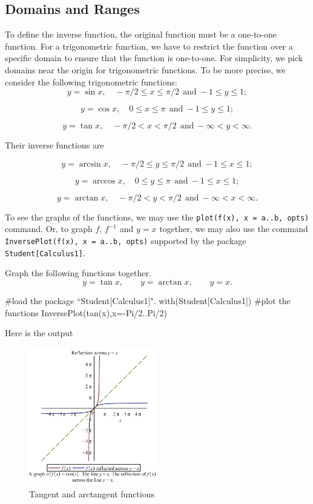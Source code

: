 \documentclass[
  en,11pt,simple]{elegantbook}
\renewenvironment{example}[1][]{
  \refstepcounter{exam}
  \par\noindent\textbf{\color{main}{\examplename} \theexam #1}
  \rmfamily
}{
  \par\ignorespacesafterend
}
\begin{document}
\hypertarget{domains-and-ranges}{%
\subsection{Domains and Ranges}\label{domains-and-ranges}}

To define the inverse function, the original function must be a one-to-one function.
For a trigonometric function, we have to restrict the function over a specific domain to ensure that the function is one-to-one.
For simplicity, we pick domains near the origin for trigonometric functions. To be more precise, we consider the following trigonometric functions:
\[
y=\sin x,\quad -\pi/2\leq x\leq \pi/2 ~~\text{and}~ -1\leq y\leq 1;
\]

\[
y=\cos x,\quad 0\leq x\leq \pi ~~\text{and}~ -1\leq y\leq 1;
\]

\[
y=\tan x,\quad -\pi/2< x< \pi/2 ~~\text{and}~ -\infty<y<\infty.
\]

Their inverse functions are

\[
y=\arcsin x,\quad -\pi/2\leq y\leq \pi/2 ~~\text{and}~ -1\leq x\leq 1;
\]

\[
y=\arccos x,\quad 0\leq y\leq \pi ~~\text{and}~ -1\leq x\leq 1;
\]

\[
y=\arctan x,\quad -\pi/2< y< \pi/2 ~~\text{and}~ -\infty< x<\infty.
\]

To see the graphs of the functions, we may use the \texttt{plot(f(x),\ x\ =\ a..b,\ opts)} command. Or, to graph \(f\), \(f^{-1}\) and \(y=x\) together, we may also use the command \texttt{InversePlot(f(x),\ x\ =\ a..b,\ opts)} supported by the package \texttt{Student{[}Calculus1{]}}.

\begin{example}

Graph the following functions together.
\[
y=\tan x, \qquad y=\arctan x, \qquad y=x.
\]
\end{example}

\begin{solution}
{}
\#load the package ``Student{[}Calculus1{]}".
with(Student{[}Calculus1{]})
\#plot the functions
InversePlot(tan(x),x=-Pi/2..Pi/2)

Here is the output

\begin{figure}
\centering
\includegraphics[width=0.5\textwidth,height=\textheight]{figs/InversePlot_tanx.png}
\caption{Tangent and arctangent functions}
\end{figure}
\end{solution}
\end{document}
